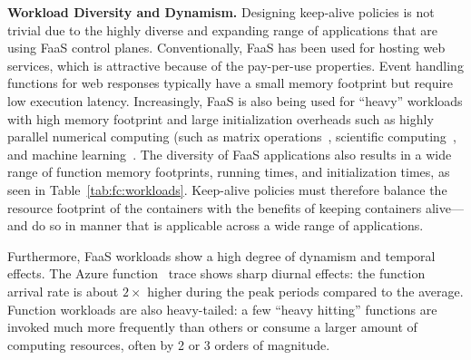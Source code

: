 \noindent \textbf{Workload Diversity and Dynamism.}
%
Designing keep-alive policies is not trivial due to the highly diverse and expanding range of applications that are using FaaS control planes.
Conventionally, FaaS has been used for hosting web services, which is attractive because of the pay-per-use properties. 
Event handling functions for web responses typically have a small memory footprint but require low execution latency. 
Increasingly, FaaS is also being used for ``heavy'' workloads with high memory footprint and large initialization overheads such as highly parallel numerical computing (such as matrix operations~\cite{jonas2017occupy}, scientific computing~\cite{shankar2018numpywren}, and machine learning~\cite{akkus_sand_2018}. 
The diversity of FaaS applications also results in a wide range of function memory footprints, running times, and initialization times, as seen in Table~\ref{tab:fc:workloads}.  
Keep-alive policies must therefore balance the resource footprint of the containers with the benefits of keeping containers alive---and do so in manner that is applicable across a wide range of applications. 


Furthermore, FaaS workloads show a high degree of dynamism and temporal effects. 
The Azure function~\cite{shahrad_serverless_2020} trace shows sharp diurnal effects: the function arrival rate is about $2\times$ higher during the peak periods compared to the average. 
Function workloads are also heavy-tailed: a few ``heavy hitting'' functions are invoked much more frequently than others or consume a larger amount of computing resources, often by 2 or 3 orders of magnitude. 


